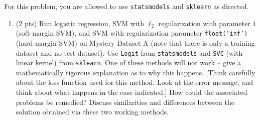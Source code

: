 \documentclass[10pt,letter,notitlepage]{article}
\newcounter{exercise}
\begin{document}
\begin{exercise}
For this problem, you are allowed to use \texttt{statsmodels} and \texttt{sklearn} as directed.
\begin{enumerate}
\item (2 pts) Run logistic regression, SVM with $\ell_2$ regularization with parameter $1$ (soft-margin SVM), and SVM with regularization parameter \texttt{float('inf')} (hard-margin SVM) on Mystery Dataset A (note that there is only a training dataset and no test dataset). Use \texttt{Logit} from \texttt{statsmodels} and \texttt{SVC} (with linear kernel) from \texttt{sklearn}.
One of these methods will not work -- give a mathematically rigorous explanation as to why this happens.
[Think carefully about the loss function used for this method. Look at the error message, and think about what happens in the case indicated.]
How could the associated problems be remedied?
Discuss similarities and differences between the solution obtained via these two working methods. 


\end{enumerate}
\end{exercise}
\end{document}
